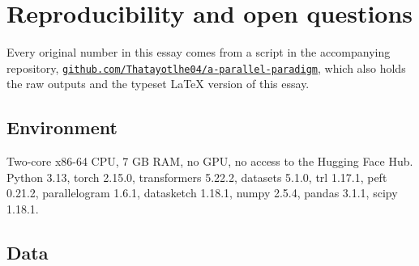 \section{Reproducibility and open questions}

Every original number in this essay comes from a script in the accompanying repository, \href{https://github.com/Thatayotlhe04/a-parallel-paradigm}{\texttt{github.com/Thatayotlhe04/a-parallel-paradigm}}, which also holds the raw outputs and the typeset LaTeX version of this essay.

\subsection{Environment}

Two-core x86-64 CPU, 7 GB RAM, no GPU, no access to the Hugging Face Hub. Python 3.13, torch 2.15.0, transformers 5.22.2, datasets 5.1.0, trl 1.17.1, peft 0.21.2, parallelogram 1.6.1, datasketch 1.18.1, numpy 2.5.4, pandas 3.1.1, scipy 1.18.1.

\subsection{Data}

